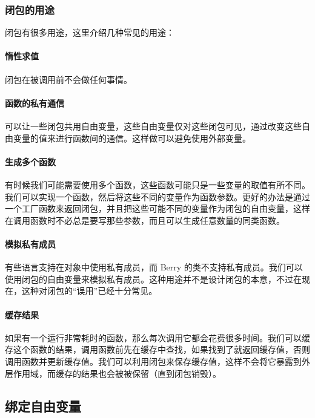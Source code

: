\subsubsection{闭包的用途}

闭包有很多用途，这里介绍几种常见的用途：

\paragraph{惰性求值}

闭包在被调用前不会做任何事情。

\paragraph{函数的私有通信}

可以让一些闭包共用自由变量，这些自由变量仅对这些闭包可见，通过改变这些自由变量的值来进行函数间的通信。这样做可以避免使用外部变量。

\paragraph{生成多个函数}

有时候我们可能需要使用多个函数，这些函数可能只是一些变量的取值有所不同。我们可以实现一个函数，然后将这些不同的变量作为函数参数。更好的办法是通过一个工厂函数来返回闭包，并且把这些可能不同的变量作为闭包的自由变量，这样在调用函数时不必总是要写那些参数，而且可以生成任意数量的同类函数。

\paragraph{模拟私有成员}

有些语言支持在对象中使用私有成员，而 Berry 的类不支持私有成员。我们可以使用闭包的自由变量来模拟私有成员。这种用途并不是设计闭包的本意，不过在现在，这种对闭包的``误用''已经十分常见。

\paragraph{缓存结果}

如果有一个运行非常耗时的函数，那么每次调用它都会花费很多时间。我们可以缓存这个函数的结果，调用函数前先在缓存中查找，如果找到了就返回缓存值，否则调用函数并更新缓存值。我们可以利用闭包来保存缓存值，这样不会将它暴露到外层作用域，而缓存的结果也会被被保留（直到闭包销毁）。

\subsection{绑定自由变量}

